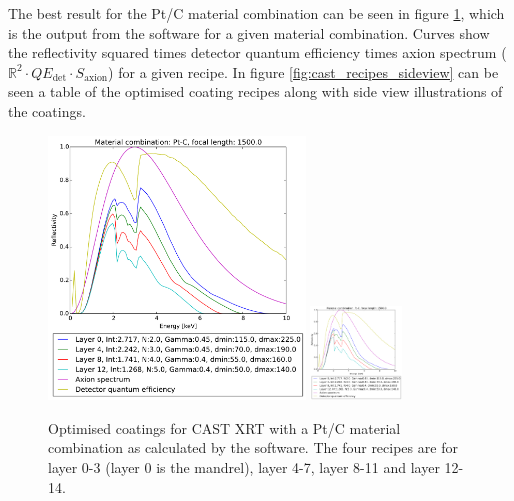 The best result for the Pt/C material combination can be seen in figure \ref{fig:pt-c_optimized_recipes}, which is the output from the software for a given material combination. Curves show the reflectivity squared times detector quantum efficiency times axion spectrum ($\mathbb{R}^2\cdot QE_{\text{det}}\cdot S_{\text{axion}}$) for a given recipe. In figure \ref{fig:cast_recipes_sideview} can be seen a table of the optimised coating recipes along with side view illustrations of the coatings.

\begin{figure}[htbp!]
  \centering
    \includegraphics[height=7cm]{figures/cast/pt-c_optimized_recipes1.pdf}  \includegraphics[height=2.5cm]{figures/cast/pt-c_optimized_recipes2.pdf}

  \caption{\footnotesize Optimised coatings for CAST XRT with a Pt/C material combination as calculated by the software. The four recipes are for layer 0-3 (layer 0 is the mandrel), layer 4-7, layer 8-11 and layer 12-14.}
  \label{fig:pt-c_optimized_recipes}
\end{figure}

